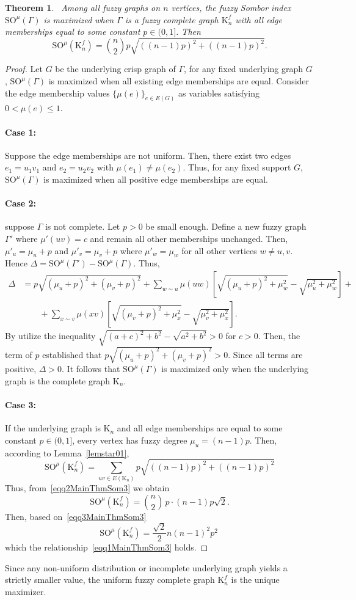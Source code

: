 \documentclass[12pt]{amsart}
\newcommand{\case}[1]{\paragraph*{Case #1:}}
\newtheorem{theorem}{Theorem}[section]
\newcommand{\SOG}{\mathrm{SO}^{\mu}}
\newcommand{\KK}{\mathrm{K}}
\begin{document}
\begin{theorem}~\label{MainThmSom3}
Among all fuzzy graphs on $n$ vertices, the fuzzy Sombor index $\SOG(\Gamma)$ is maximized when $\Gamma$ is a fuzzy complete graph $\KK_n^f$ with all edge memberships equal to some constant $p \in (0,1]$. Then
\begin{equation}~\label{eqq1MainThmSom3}
\SOG(\KK_n^f)=\binom{n}{2} p \sqrt{( (n-1)p)^2 + ((n-1)p)^2 }.
\end{equation}
\end{theorem}
\begin{proof}
Let $G$ be the underlying crisp graph of $\Gamma$, for any fixed underlying graph $G$, $\SOG(\Gamma)$ is maximized when all existing edge memberships are equal.
Consider the edge membership values $\{\mu(e)\}_{e \in E(G)}$ as variables satisfying $0 < \mu(e) \leqslant 1$.
\case{1} Suppose the edge memberships are not uniform. Then, there exist two edges $e_1=u_1v_1$ and $e_2=u_2v_2$ with $\mu(e_1) \neq \mu(e_2)$.  
Thus, for any fixed support $G$, $\SOG(\Gamma)$ is maximized when all positive edge memberships are equal.

\case{2} suppose $\Gamma$ is not complete.
Let $p> 0$ be small enough. Define a new fuzzy graph $\Gamma'$ where $\mu'(uv) = c$ and remain all other memberships unchanged. Then, $\mu'_u=\mu_u+p$ and $\mu'_v=\mu_v+p$ where  $\mu'_w=\mu_w$ for all other vertices $w \neq u,v$. Hence $\Delta = \SOG(\Gamma') - \SOG(\Gamma)$. Thus, 
\[
\begin{aligned}
\Delta&=p \sqrt{(\mu_u+p)^2+(\mu_v+p)^2} 
+\sum_{w \sim u} \mu(uw) \left[ \sqrt{(\mu_u+p)^2+\mu_w^2}-\sqrt{\mu_u^2+\mu_w^2} \right]+\\
&\qquad+\sum_{x \sim v} \mu(xv) \left[ \sqrt{(\mu_v+p)^2+\mu_x^2}-\sqrt{\mu_v^2+\mu_x^2} \right].
\end{aligned}
\]
By utilize the inequality $\sqrt{(a + c)^2 + b^2} - \sqrt{a^2 + b^2} > 0$ for $c > 0$. Then, the term of $p$ established that $p \sqrt{(\mu_u+p)^2+(\mu_v+p)^2}>0$. Since all terms are positive, $\Delta > 0$. It follows that $\SOG(\Gamma)$ is maximized only when the underlying graph is the complete graph $\KK_n$.

\case{3} If the underlying graph is $\KK_n$ and all edge memberships are equal to some constant $p \in (0,1]$, every vertex has fuzzy degree $\mu_u=(n-1)p$. Then, according to Lemma~\ref{lemstar01}, 
\begin{equation}~\label{eqq2MainThmSom3}
\SOG(\KK_n^f) = \sum_{uv \in E(\KK_n)} p \sqrt{((n-1)p)^2+((n-1)p)^2}
\end{equation}
Thus, from~\eqref{eqq2MainThmSom3} we obtain 
\begin{equation}~\label{eqq3MainThmSom3}
\SOG(\KK_n^f)=\binom{n}{2} \, p \cdot (n-1)p\sqrt{2}.
\end{equation}
Then, based on~\eqref{eqq3MainThmSom3}
\[
\SOG(\KK_n^f)=\frac{\sqrt{2}}{2} n (n-1)^2 p^2
\]
which the relationship~\eqref{eqq1MainThmSom3} holds.
\end{proof}
Since any non-uniform distribution or incomplete underlying graph yields a strictly smaller value, the uniform fuzzy complete graph $\KK_n^f$ is the unique maximizer.
\end{document}
